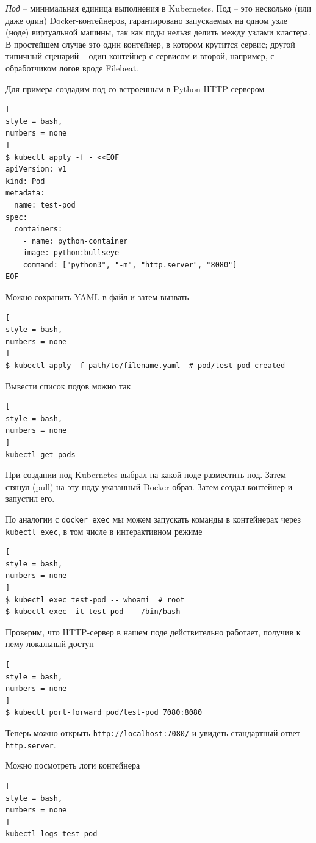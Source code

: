 \documentclass[%
	11pt,
	a4paper,
	utf8,
		]{article}
\begin{document}
\emph{Под} -- минимальная единица выполнения в Kubernetes. Под -- это несколько (или даже один) Docker-контейнеров, гарантировано запускаемых на одном узле (ноде) виртуальной машины, так как поды нельзя делить между узлами кластера. В простейшем случае это один контейнер, в котором крутится сервис; другой типичный сценарий -- один контейнер с сервисом и второй, например, с обработчиком логов вроде Filebeat.

Для примера создадим под со встроенным в Python HTTP-сервером
\begin{lstlisting}[
style = bash,
numbers = none
]
$ kubectl apply -f - <<EOF
apiVersion: v1
kind: Pod
metadata:
  name: test-pod
spec:
  containers:
    - name: python-container
    image: python:bullseye
    command: ["python3", "-m", "http.server", "8080"]
EOF
\end{lstlisting}

Можно сохранить YAML в файл и затем вызвать
\begin{lstlisting}[
style = bash,
numbers = none
]
$ kubectl apply -f path/to/filename.yaml  # pod/test-pod created
\end{lstlisting}

Вывести список подов можно так
\begin{lstlisting}[
style = bash,
numbers = none
]
kubectl get pods
\end{lstlisting}

При создании под Kubernetes выбрал на какой ноде разместить под. Затем стянул (pull) на эту ноду указанный Docker-образ. Затем создал контейнер и запустил его.

По аналогии с \verb|docker exec| мы можем запускать команды в контейнерах через \verb*|kubectl exec|, в том числе в интерактивном режиме
\begin{lstlisting}[
style = bash,
numbers = none
]
$ kubectl exec test-pod -- whoami  # root
$ kubectl exec -it test-pod -- /bin/bash
\end{lstlisting}

Проверим, что HTTP-сервер в нашем поде действительно работает, получив к нему локальный доступ
\begin{lstlisting}[
style = bash,
numbers = none
]
$ kubectl port-forward pod/test-pod 7080:8080
\end{lstlisting}

Теперь можно открыть \verb|http://localhost:7080/| и увидеть стандартный ответ \verb*|http.server|.

Можно посмотреть логи контейнера
\begin{lstlisting}[
style = bash,
numbers = none
]
kubectl logs test-pod
\end{lstlisting}
\end{document}
